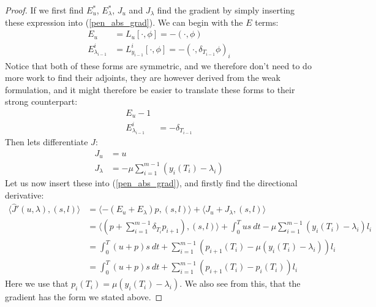 \documentclass[11pt,a4paper]{article}
\begin{document}
\begin{proof}
If we first find $E_u^*$, $E_{\lambda}^*$, $J_u$ and $J_{\lambda}$ find the gradient by simply inserting these expression into (\ref{pen_abs_grad}). We can begin with the $E$ terms:
\begin{align*}
E_u &= L_u[\cdot,\phi] = -(\cdot,\phi) \\
E_{\lambda_{i-1}}^i &= L_{y_{i-1}}^i[\cdot,\phi] = -(\cdot,\delta_{T_{i-1}}\phi)_i
\end{align*}
Notice that both of these forms are symmetric, and we therefore don't need to do more work to find their adjoints, they are however derived from the weak formulation, and it might therefore be easier to translate these forms to their strong counterpart:
\begin{align*}
E_u -1 \\
E_{\lambda_{i-1}}^i &= -\delta_{T_{i-1}}
\end{align*}
Then lets differentiate $J$:
\begin{align*}
J_u &= u \\
J_{\lambda} &= - \mu \sum_{i=1}^{m-1}(y_{i}(T_i)-\lambda_i)
\end{align*}
Let us now insert these into (\ref{pen_abs_grad}), and firstly find the directional derivative:
\begin{align*}
\langle \hat{J}'(u,\lambda), (s,l)\rangle&=\langle -(E_u+E_{\lambda})p, (s,l)\rangle + \langle J_u+J_{\lambda}, (s,l)\rangle \\
&= \langle (p+\sum_{i=1}^{m-1} \delta_{T_i}p_{i+1}) , (s,l)\rangle+ \int_0^T us \ dt - \mu \sum_{i=1}^{m-1}(y_{i}(T_i)-\lambda_i)l_i\\
&=\int_0^T (u+p)s \ dt +\sum_{i=1}^{m-1}(p_{i+1}(T_i) -\mu(y_{i}(T_i)-\lambda_i) )l_i \\
&= \int_0^T (u+p)s \ dt +\sum_{i=1}^{m-1}(p_{i+1}(T_i) -p_{i}(T_i) )l_i
\end{align*} 
Here we use that $p_i(T_i) = \mu(y_{i}(T_i)-\lambda_i)$. We also see from this, that the gradient has the form we stated above.
\end{proof} 
\end{document}
